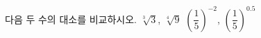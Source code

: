 다음 두 수의 대소를 비교하시오.
 $\sqrt[3]{3}$, $\sqrt[4]{9}$
 $\left(\dfrac{1}{5}\right)^{-2}$, $\left(\dfrac{1}{5}\right)^{0.5}$
